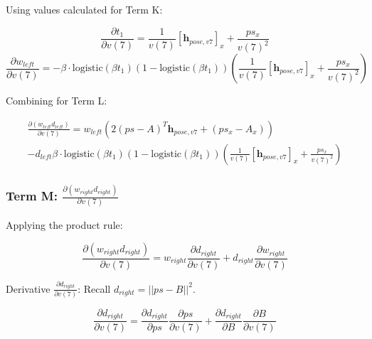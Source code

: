 \documentclass[11pt]{article}
\begin{document}
                Using values calculated for Term K:

                \begin{equation}
                    \frac{\partial t_1}{\partial v(7)} =  \frac{1}{v(7)}[\mathbf{h}_{pose,v7}]_x + \frac{ps_{x}}{v(7)^2}
                \end{equation}
                \begin{equation}
                    \frac{\partial w_{left}}{\partial v(7)} = -\beta \cdot \text{logistic}(\beta t_1)(1 - \text{logistic}(\beta t_1)) \left( \frac{1}{v(7)}[\mathbf{h}_{pose,v7}]_x + \frac{ps_{x}}{v(7)^2} \right)
                \end{equation}

                Combining for Term L:

                \begin{multline}
                    \frac{\partial (w_{left} d_{left})}{\partial v(7)} = w_{left} \left( 2 (ps - A)^T \mathbf{h}_{pose,v7}  + (ps_x - A_x) \right) \\ - d_{left}\beta \cdot \text{logistic}(\beta t_1)(1 - \text{logistic}(\beta t_1)) \left( \frac{1}{v(7)}[\mathbf{h}_{pose,v7}]_x + \frac{ps_{x}}{v(7)^2} \right)
                \end{multline}

            \subsubsection*{Term M: $\frac{\partial (w_{right} d_{right})}{\partial v(7)}$}

                Applying the product rule:

                \begin{equation}
                    \frac{\partial (w_{right} d_{right})}{\partial v(7)} = w_{right} \frac{\partial d_{right}}{\partial v(7)} + d_{right} \frac{\partial w_{right}}{\partial v(7)}
                \end{equation}

                Derivative $\frac{\partial d_{right}}{\partial v(7)}$:
                Recall $d_{right} = ||ps - B||^2$.

                \begin{equation}
                    \frac{\partial d_{right}}{\partial v(7)} = \frac{\partial d_{right}}{\partial ps} \frac{\partial ps}{\partial v(7)} + \frac{\partial d_{right}}{\partial B} \frac{\partial B}{\partial v(7)}
                \end{equation}
\end{document}
